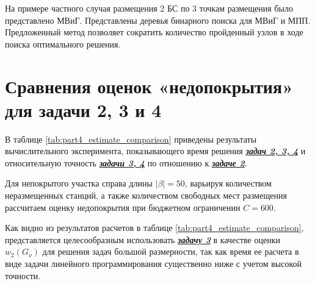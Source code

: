 На примере частного случая размещения 2 БС по 3 точкам размещения было представлено МВиГ. Представлены деревья бинарного поиска для МВиГ и МПП. Предложенный метод позволяет сократить количество пройденный узлов в ходе поиска оптимального решения. 



\fixme{==================================================}





\section{Сравнения оценок «недопокрытия» для задачи 2, 3 и 4}\label{part4:task_234}

В таблице \cref{tab:part4_estimate_comparison} приведены результаты вычислительного эксперимента, показывающего время решения \underline{\textit{\textbf{задач 2, 3, 4}}} и относительную точность \underline{\textit{\textbf{задачи 3, 4}}} по отношению к \underline{\textit{\textbf{задаче 2}}}.

Для непокрытого участка справа длины $|\beta| = 50$, варьируя количеством неразмещенных станций, а также количеством свободных мест размещения рассчитаем оценку недопокрытия при бюджетном ограничении $C=600$.


Как видно из результатов расчетов в таблице \cref{tab:part4_estimate_comparison}, представляется целесообразным  использовать  \underline{\textit{\textbf{задачу 3}}} в качестве оценки $w_2 (G_\nu )$ для решения задач большой размерности, так как время ее расчета в виде задачи линейного программирования существенно ниже с учетом высокой точности.


